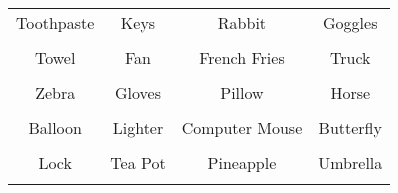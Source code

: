 \documentclass[12pt,a4paper]{article}
\begin{document}
\thispagestyle{empty}
\begin{table}[]
\centering
\Huge
\begin{tabular}{cccc}
 Toothpaste& Keys& Rabbit& Goggles\\  & & & \\
 Towel& Fan& French Fries& Truck\\  & & & \\
 Zebra& Gloves& Pillow& Horse\\  & & & \\
 Balloon& Lighter& Computer Mouse& Butterfly\\  & & & \\
 Lock& Tea Pot& Pineapple& Umbrella\\  & & & \\
\end{tabular}
\end{table}
\end{document}
